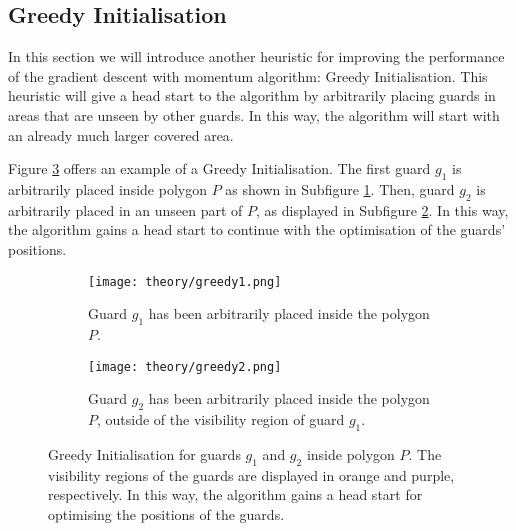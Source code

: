 \subsection{Greedy Initialisation}
In this section we will introduce another heuristic for improving the performance of the gradient descent with momentum algorithm: Greedy Initialisation. This heuristic will give a head start to the algorithm by arbitrarily placing guards in areas that are unseen by other guards. In this way, the algorithm will start with an already much larger covered area.

Figure \ref{fig:greedy} offers an example of a Greedy Initialisation. The first guard $g_1$ is arbitrarily placed inside polygon $P$ as shown in Subfigure \ref{fig:greedy1}. Then, guard $g_2$ is arbitrarily placed in an unseen part of $P$, as displayed in Subfigure \ref{fig:greedy2}. In this way, the algorithm gains a head start to continue with the optimisation of the guards' positions.

\begin{figure}[h!]
    \centering
    \begin{subfigure}{0.45\textwidth}
        \texttt{[image: theory/greedy1.png]}
        \caption{Guard $g_1$ has been arbitrarily placed inside the polygon $P$.}
        \label{fig:greedy1}
    \end{subfigure}
    \hfill
    \begin{subfigure}{0.45\textwidth}
        \texttt{[image: theory/greedy2.png]}
        \caption{Guard $g_2$ has been arbitrarily placed inside the polygon $P$, outside of the visibility region of guard $g_1$.}
        \label{fig:greedy2}
    \end{subfigure}
    \caption{Greedy Initialisation for guards $g_1$ and $g_2$ inside polygon $P$. The visibility regions of the guards are displayed in orange and purple, respectively. In this way, the algorithm gains a head start for optimising the positions of the guards.}
    \label{fig:greedy}
\end{figure}

